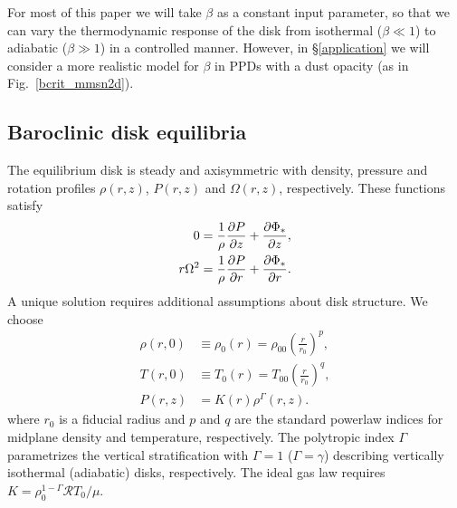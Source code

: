 For most of this paper we will take $\beta$ as a constant input
parameter, so that we can vary the thermodynamic response of the
disk from isothermal ($\beta\ll 1$) to adiabatic ($\beta \gg 1$) in a
controlled manner. However, in \S\ref{application} 
we will consider a more realistic model for $\beta$ in
PPDs with a dust opacity (as in Fig.\  \ref{bcrit_mmsn2d}).  
 
 




\subsection{Baroclinic disk equilibria}\label{eqm}
The equilibrium disk is steady and axisymmetric with density,
pressure and rotation profiles $\rho(r,z)$, $P(r,z)$ and
$\Omega(r,z)$, respectively. These functions satisfy  
\begin{subequations}\begin{align}
  0 &= \frac{1}{\rho}\frac{\partial P}{\partial z} + \frac{\partial \Phi_*}{\partial z},\label{vert_equilibrium}\\
  r\Omega^2&= \frac{1}{\rho}\frac{\partial P}{\partial r} + \frac{\partial \Phi_*}{\partial
    r}.\label{hori_equilibrium} 
\end{align} \end{subequations}
A unique solution requires additional assumptions about disk structure.  We choose
\begin{subequations}\begin{align}
 \rho(r,0) &\equiv \rho_0(r) = \rho_{00}\left(\frac{r}{r_0}\right)^p, \\
 T(r,0) &\equiv T_0(r) = T_{00}\left(\frac{r}{r_0}\right)^q, \\
 P(r,z) & = K(r)\rho^{\Gamma}(r,z). \label{eqm_press}
\end{align} \end{subequations}
where $r_0$ is a fiducial radius and $p$ and $q$ are the standard powerlaw indices
for midplane density and temperature, respectively.  The polytropic index $\Gamma$ 
parametrizes the vertical stratification with $\Gamma = 1$ ($\Gamma = \gamma$)
describing vertically isothermal (adiabatic) disks, respectively.  The ideal gas
law requires $K = \rho_0^{1-\Gamma}\mathcal{R} T_0/\mu$.

